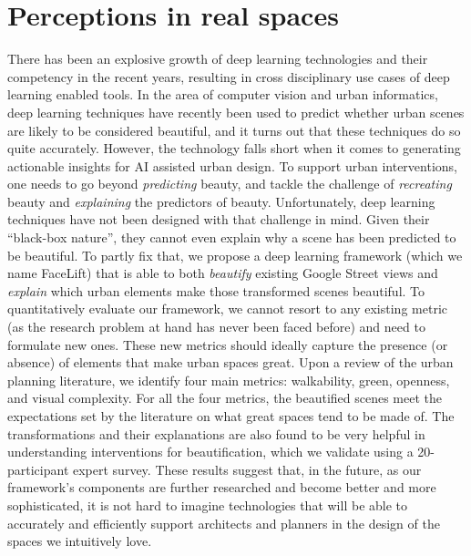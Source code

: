 \chapter{Perceptions in real spaces}
\label{chap:quant_perception}


\graphicspath{{Chapter5/plots/} {Chapter5/plots/examples/} {Chapter5/plots/GAN_examples/}}
    
There has been an explosive growth of deep learning technologies and their competency in the recent years, resulting in cross disciplinary use cases of deep learning enabled tools. In the area of computer vision and urban informatics, deep learning techniques have recently been used to predict whether urban scenes are likely to be considered beautiful, and it turns out that these techniques do so quite accurately. However, the technology falls short when it comes to generating actionable insights for AI assisted urban design. To support urban interventions, one needs to go beyond \emph{predicting} beauty, and tackle the challenge of \emph{recreating} beauty and \emph{explaining} the predictors of beauty.  Unfortunately, deep learning techniques have not been designed with that challenge in mind. Given their ``black-box nature'', they cannot even explain why a scene has been predicted to be beautiful. To partly fix that, we propose a deep learning framework (which we name  FaceLift) that is able to both \emph{beautify} existing Google Street views and \emph{explain} which urban elements make those transformed scenes beautiful. To quantitatively evaluate our framework, we cannot resort to any existing metric (as the research problem at hand has never been faced before) and need to  formulate new ones. These new metrics should ideally capture the presence (or absence) of elements that make urban spaces great. Upon a review of the urban planning literature, we identify four main metrics: walkability, green, openness, and visual complexity.  For all the four metrics, the beautified scenes meet the expectations set by the literature on what great spaces tend to be made of. The transformations and their explanations are also found to be very helpful in understanding interventions for beautification, which we validate using a 20-participant expert survey. These results suggest that, in the future, as our framework's components are further researched and become better and more sophisticated, it is not hard to imagine technologies that will be able to accurately and efficiently support architects and planners in the design of the spaces we intuitively love.


